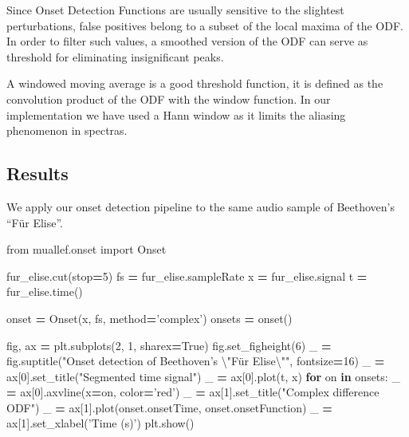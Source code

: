 \documentclass[american,]{article}
\newenvironment{Shaded}{\begin{snugshade}}{\end{snugshade}}
\newcommand{\CharTok}[1]{\textcolor[rgb]{0.31,0.60,0.02}{#1}}
\newcommand{\ControlFlowTok}[1]{\textcolor[rgb]{0.13,0.29,0.53}{\textbf{#1}}}
\newcommand{\DecValTok}[1]{\textcolor[rgb]{0.00,0.00,0.81}{#1}}
\newcommand{\ImportTok}[1]{#1}
\newcommand{\KeywordTok}[1]{\textcolor[rgb]{0.13,0.29,0.53}{\textbf{#1}}}
\newcommand{\NormalTok}[1]{#1}
\newcommand{\OperatorTok}[1]{\textcolor[rgb]{0.81,0.36,0.00}{\textbf{#1}}}
\newcommand{\StringTok}[1]{\textcolor[rgb]{0.31,0.60,0.02}{#1}}
\newcommand{\VariableTok}[1]{\textcolor[rgb]{0.00,0.00,0.00}{#1}}
\begin{document}
Since Onset Detection Functions are usually sensitive
to the slightest perturbations, false positives belong
to a subset of the local maxima of the ODF.
In order to filter such values, a smoothed version of the ODF
can serve as threshold for eliminating insignificant peaks.

A windowed moving average is a good threshold function,
it is defined as the convolution product of the ODF
with the window function.
In our implementation we have used a Hann window as it
limits the aliasing phenomenon in spectras.

\hypertarget{results}{%
\subsection{Results}\label{results}}

We apply our onset detection pipeline to the same
audio sample of Beethoven's ``Für Elise''.

\begin{Shaded}
\begin{Highlighting}[]
\ImportTok{from}\NormalTok{ muallef.onset }\ImportTok{import}\NormalTok{ Onset}

\NormalTok{fur_elise.cut(stop}\OperatorTok{=}\DecValTok{5}\NormalTok{)}
\NormalTok{fs }\OperatorTok{=}\NormalTok{ fur_elise.sampleRate}
\NormalTok{x }\OperatorTok{=}\NormalTok{ fur_elise.signal}
\NormalTok{t }\OperatorTok{=}\NormalTok{ fur_elise.time()}

\NormalTok{onset }\OperatorTok{=}\NormalTok{ Onset(x, fs, method}\OperatorTok{=}\StringTok{'complex'}\NormalTok{)}
\NormalTok{onsets }\OperatorTok{=}\NormalTok{ onset()}

\NormalTok{fig, ax }\OperatorTok{=}\NormalTok{ plt.subplots(}\DecValTok{2}\NormalTok{, }\DecValTok{1}\NormalTok{, sharex}\OperatorTok{=}\VariableTok{True}\NormalTok{)}
\NormalTok{fig.set_figheight(}\DecValTok{6}\NormalTok{)}
\NormalTok{_ }\OperatorTok{=}\NormalTok{ fig.suptitle(}\StringTok{"Onset detection of Beethoven's }\CharTok{\textbackslash{}"}\StringTok{Für Elise}\CharTok{\textbackslash{}"}\StringTok{"}\NormalTok{, fontsize}\OperatorTok{=}\DecValTok{16}\NormalTok{)}
\NormalTok{_ }\OperatorTok{=}\NormalTok{ ax[}\DecValTok{0}\NormalTok{].set_title(}\StringTok{"Segmented time signal"}\NormalTok{)}
\NormalTok{_ }\OperatorTok{=}\NormalTok{ ax[}\DecValTok{0}\NormalTok{].plot(t, x)}
\ControlFlowTok{for}\NormalTok{ on }\KeywordTok{in}\NormalTok{ onsets:}
\NormalTok{    _ }\OperatorTok{=}\NormalTok{ ax[}\DecValTok{0}\NormalTok{].axvline(x}\OperatorTok{=}\NormalTok{on, color}\OperatorTok{=}\StringTok{'red'}\NormalTok{)}
\NormalTok{_ }\OperatorTok{=}\NormalTok{ ax[}\DecValTok{1}\NormalTok{].set_title(}\StringTok{"Complex difference ODF"}\NormalTok{)}
\NormalTok{_ }\OperatorTok{=}\NormalTok{ ax[}\DecValTok{1}\NormalTok{].plot(onset.onsetTime, onset.onsetFunction)}
\NormalTok{_ }\OperatorTok{=}\NormalTok{ ax[}\DecValTok{1}\NormalTok{].set_xlabel(}\StringTok{'Time (s)'}\NormalTok{)}
\NormalTok{plt.show()}
\end{Highlighting}
\end{Shaded}
\end{document}
